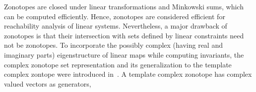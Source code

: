 Zonotopes are closed under linear transformations and Minkowski sums, which can be computed efficiently.  Hence, zonotopes are
considered efficient for reachability analysis of linear systems.  Nevertheless,
a major drawback of zonotopes is that their intersection with sets defined by linear
constraints need not be zonotopes.  %
%
To incorporate the possibly complex (having real and imaginary parts)
eigenstructure of linear maps while computing invariants, the complex
zonotope set representation and its generalization to the template
complex zontope were introduced in~\cite{adimoolam2016using,tcz2017}.
A template complex zonotope has complex valued vectors as generators,
